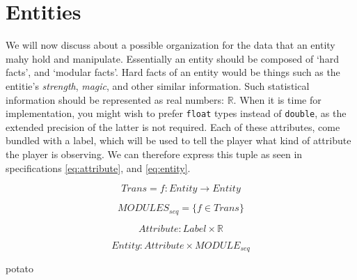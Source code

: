 \section{Entities}
\label{sec:entities}

We will now discuss about a possible organization for the data that an entity
mahy hold and manipulate. Essentially an entity should be composed of `hard
facts', and `modular facts'. Hard facts of an entity would be things such as the
entitie's \textit{strength}, \textit{magic}, and other similar information. Such
statistical information should be represented as real numbers: $\mathbb{R}$.
When it is time for implementation, you might wish to prefer \texttt{float}
types instead of \texttt{double}, as the extended precision of the latter is not
required. Each of these attributes, come bundled with a label, which will be
used to tell the player what kind of attribute the player is observing. We can
therefore express this tuple as seen in specifications \ref{eq:attribute}, and
\ref{eq:entity}.

\begin{equation}
  \label{eq:modulefn}
  Trans = f \colon Entity \to Entity
\end{equation}

\begin{equation}
  \label{eq:fnseq}
  MODULES_{seq} = \{ f \in Trans \}
\end{equation}

\begin{equation}
  \label{eq:attribute} Attribute: Label \times \mathbb{R}
\end{equation}

\begin{equation}
  \label{eq:entity} Entity: Attribute \times MODULE_{seq}
\end{equation}

\begin{description}
   potato
\end{description}
